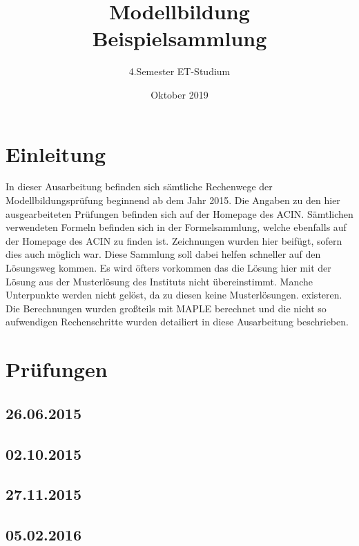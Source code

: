 \documentclass[a4paper,12p]{article}
\title{\huge Modellbildung\\\large \huge Beispielsammlung}
\author{\huge 4.Semester ET-Studium}
\date{\huge Oktober 2019}
\begin{document}
	\maketitle
	\newpage
	\tableofcontents
	\newpage
	
	\section{Einleitung}
	In dieser Ausarbeitung befinden sich sämtliche Rechenwege der Modellbildungsprüfung beginnend ab dem Jahr 2015. Die Angaben zu den hier ausgearbeiteten Prüfungen befinden sich auf der Homepage des ACIN. Sämtlichen verwendeten Formeln befinden sich in der Formelsammlung, welche ebenfalls auf der Homepage des ACIN zu finden ist. Zeichnungen wurden hier beifügt, sofern dies auch möglich war. Diese Sammlung soll dabei helfen schneller auf den Lösungsweg kommen. Es wird öfters vorkommen das die Lösung hier mit der Lösung aus der Musterlösung des Instituts nicht übereinstimmt. Manche Unterpunkte werden nicht gelöst, da zu diesen keine Musterlösungen. existeren. Die Berechnungen wurden großteils mit MAPLE berechnet und die nicht so aufwendigen Rechenschritte wurden detailiert in diese Ausarbeitung beschrieben.
	
	\section{Prüfungen}
	
	\subsection{26.06.2015}
	
	
	
	
	
	\newpage
	\subsection{02.10.2015}
	
	
	
	
	
	\newpage
	\subsection{27.11.2015}
	
	
	
	
	\newpage
	\subsection{05.02.2016}
	
	
	
	
\end{document}
